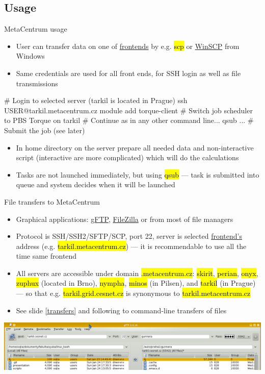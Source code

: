 \documentclass[compress, ucs, xelatex, 11pt, xcolor=svgnames,
  hyperref={
    bookmarks=true,
    unicode=true,
    colorlinks=true,
    pdftitle={Linux, command line and MetaCentrum},
    plainpages=false,
    pdfauthor={Vojtech Zeisek},
    pdfsubject={Course about use of Linux command line, writing shell scripts and using MetaCentrum of CESNET},
    pdfcreator={XeLaTeX},
    pdfkeywords={Linux, GNU, BASH, shell, command line, MetaCentrum},
    linkcolor=DarkRed,
    anchorcolor=DarkBlue,
    citecolor=Indigo,
    filecolor=NavyBlue,
    menucolor=DarkMagenta,
    urlcolor=DarkBlue,
    pdftex},
  url={hyphens, lowtilde} %
  ]{beamer}
\renewcommand{\texttt}[1]{\hl{\ttfamily #1}}
\begin{document}
\subsection{Usage} %

\begin{frame}[fragile]{MetaCentrum usage}
  \begin{itemize}
    \item User can transfer data on one of \href{https://wiki.metacentrum.cz/wiki/Frontend}{frontends} by e.g. \texttt{scp} or \href{https://winscp.net/}{WinSCP} from Windows
    \item Same credentials are used for all front ends, for SSH login as well as file transmissions
  \end{itemize}
  \begin{bashcode}
    # Login to selected server (tarkil is located in Prague)
    ssh USER@tarkil.metacentrum.cz
    module add torque-client # Switch job scheduler to PBS Torque on tarkil
    # Continue as in any other command line...
    qsub ... # Submit the job (see later)
  \end{bashcode}
  \begin{itemize}
    \item In home directory on the server prepare all needed data and non-interactive script (interactive are more complicated) which will do the calculations
    \item Tasks are not launched immediately, but using \texttt{qsub} --- task is submitted into queue and system decides when it will be launched
  \end{itemize}
\end{frame}

\begin{frame}{File transfers to MetaCentrum} %
  \begin{itemize}
    \item Graphical applications: \href{https://www.gftp.org/}{gFTP}, \href{https://filezilla-project.org/}{FileZilla} or from most of file managers
    \item Protocol is SSH/SSH2/SFTP/SCP, port 22, server is selected \href{https://wiki.metacentrum.cz/wiki/Frontend}{frontend's} address (e.g. \texttt{tarkil.metacentrum.cz}) --- it is recommendable to use all the time same frontend
    \item All servers are accessible under domain \texttt{*.metacentrum.cz}: \texttt{skirit}, \texttt{perian}, \texttt{onyx}, \texttt{zuphux} (located in Brno), \texttt{nympha}, \texttt{minos} (in Pilsen), and \texttt{tarkil} (in Prague) --- so that e.g. \texttt{tarkil.grid.cesnet.cz} is synonymous to \texttt{tarkil.metacentrum.cz}
    \item See slide \ref{transfers} and following to command-line transfers of files
  \end{itemize}
  \includegraphics[width=\textwidth]{gftp.png}
\end{frame}
\end{document}
